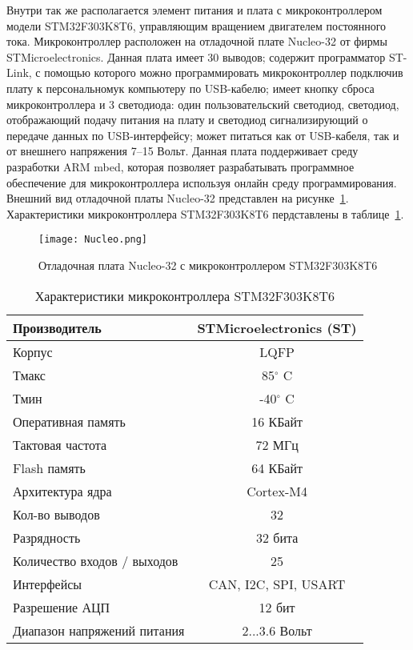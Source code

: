 Внутри так же располагается элемент питания и плата с микроконтроллером модели STM32F303K8T6, управляющим вращением двигателем постоянного тока. Микроконтроллер расположен на отладочной плате Nucleo-32 от фирмы STMicroelectronics. Данная плата имеет 30 выводов; содержит программатор ST-Link, с помощью которого можно программировать микроконтроллер подключив плату к персональномук компьютеру по USB-кабелю; имеет кнопку сброса микроконтроллера и 3 светодиода: один пользовательский светодиод, светодиод, отображающий подачу питания на плату и светодиод сигнализирующий о передаче данных по USB-интерфейсу; может питаться как от USB-кабеля, так и от внешнего напряжения 7--15 Вольт. Данная плата поддерживает среду разработки ARM mbed, которая позволяет разрабатывать программное обеспечение для микроконтроллера используя онлайн среду программирования. Внешний вид отладочной платы Nucleo-32 представлен на рисунке~\ref{Nucleo}. Характеристики микроконтроллера STM32F303K8T6 пердставлены в таблице~\ref{tabStm}.

\begin{figure}[h]
	\centering
	\texttt{[image: Nucleo.png]}%
	\caption{Отладочная плата Nucleo-32 с микроконтроллером STM32F303K8T6}
	\label{Nucleo}
\end{figure}

\begin{table}[h]
	\centering
	\caption{Характеристики микроконтроллера STM32F303K8T6}\label{tabStm}
	\begin{tabular}{|l|c|}
		\hline
		Производитель &	STMicroelectronics (ST) \\ \hline
		Корпус 	& LQFP \\ \hline
		Тмакс	&	85$^\circ$ C 	\\ \hline
		Тмин 	&	-40$^\circ$ C \\ \hline
		Оперативная память 	& 16 КБайт\\ \hline
		Тактовая частота	& 72 МГц 	\\ \hline
		Flash память & 64 КБайт\\ \hline
		Архитектура ядра & Cortex-M4	\\ \hline
		Кол-во выводов 	& 32\\ \hline
		Разрядность	& 32 бита\\ \hline
		Количество входов / выходов & 25	\\ \hline
		Интерфейсы 	& CAN, I2C, SPI, USART\\ \hline
		Разрешение АЦП & 12 бит\\ \hline
		Диапазон напряжений питания 	& 2...3.6 Вольт\\ \hline		
	\end{tabular}
\end{table}

